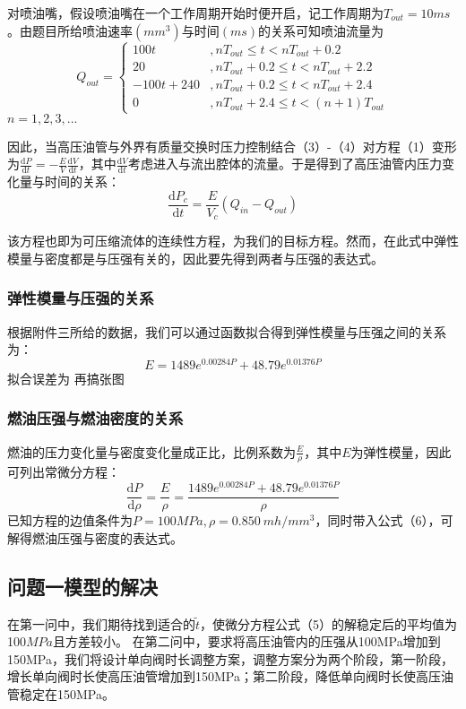 \documentclass[withoutpreface,bwprint]{cumcmthesis} %
\begin{document}
	对喷油嘴，假设喷油嘴在一个工作周期开始时便开启，记工作周期为$T_{out} = 10 ms$。由题目所给喷油速率$(mm^3)$与时间$(ms)$的关系可知喷油流量为
	\begin{equation}
	Q_{out} = \left\{ 
	\begin{array}{ll}
	100t&,nT_{out}\leq t<nT_{out}+0.2 \\
	20&,nT_{out}+0.2\leq t< nT_{out}+2.2\\
	-100t+240&,nT_{out}+0.2\leq t< nT_{out}+2.4\\
	0&,nT_{out}+2.4\leq t <(n+1)T_{out}
	\end{array}
	\right.
	\end{equation}
	$n = 1,2,3,...$
	
	因此，当高压油管与外界有质量交换时压力控制结合（3）-（4）对方程（1）变形为$\frac{\mathrm{d}P}{\mathrm{d}t}=-\frac{E}{V}\frac{\mathrm{d}V}{\mathrm{d}t}$，其中$\frac{\mathrm{d}V}{\mathrm{d}t}$考虑进入与流出腔体的流量。于是得到了高压油管内压力变化量与时间的关系：
			\begin{equation}
			\frac{\mathrm{d}P_c}{\mathrm{d}t} = \frac{E}{V_c}(Q_{in} - Q_{out})
			\end{equation}
			
			该方程也即为可压缩流体的连续性方程，为我们的目标方程。然而，在此式中弹性模量与密度都是与压强有关的，因此要先得到两者与压强的表达式。
			\subsubsection{弹性模量与压强的关系}
			根据附件三所给的数据，我们可以通过函数拟合得到弹性模量与压强之间的关系为：
			\begin{equation}
			E = 1489 e^{0.00284P} + 48.79 e^{0.01376 P}
			\end{equation}
			拟合误差为 再搞张图
			
			
			\subsubsection{燃油压强与燃油密度的关系}
			燃油的压力变化量与密度变化量成正比，比例系数为$\frac{E}{\rho}$，其中$E$为弹性模量，因此可列出常微分方程：
			\begin{equation}
			\frac{\mathrm{d}P}{\mathrm{d}\rho} = \frac{E}{\rho} = \frac{1489 e^{0.00284P} + 48.79 e^{0.01376 P}}{\rho}
			\end{equation}
			已知方程的边值条件为$P = 100MPa, \rho = 0.850\ mh/mm^3$，同时带入公式（6），可解得燃油压强与密度的表达式。
			\subsection{问题一模型的解决}
			在第一问中，我们期待找到适合的$\widetilde{t}$，使微分方程公式（5）的解稳定后的平均值为100$MPa$且方差较小。
			在第二问中，要求将高压油管内的压强从100MPa增加到150MPa，我们将设计单向阀时长调整方案，调整方案分为两个阶段，第一阶段，增长单向阀时长使高压油管增加到150MPa；第二阶段，降低单向阀时长使高压油管稳定在150MPa。
\end{document}
